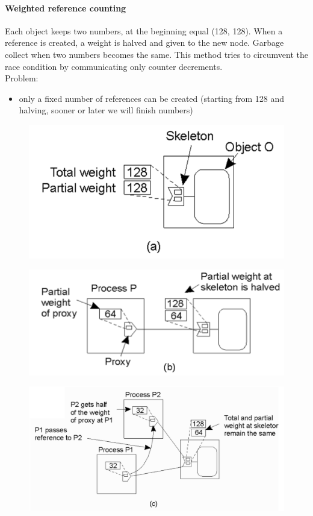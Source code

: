 \documentclass[10pt,a4paper]{article}
\begin{document}
\paragraph{Weighted reference counting}
Each object keeps two numbers, at the beginning equal (128, 128). When a reference is created, a weight is halved and given to the new node. Garbage collect when two numbers becomes the same. This method tries to circumvent the race condition by communicating only counter decrements. \\
Problem: 
\begin{itemize}
	\item only a fixed number of references can be created (starting from 128 and halving, sooner or later we will finish numbers)
\end{itemize}
\begin{figure}[h!]
\centering
\begin{minipage}{.3\textwidth}
  \includegraphics[width=.9\linewidth]{images/ref-a.png}
  \label{fig:ref-a}
\end{minipage}%
\begin{minipage}{.3\textwidth}
  \includegraphics[width=.9\linewidth]{images/ref-b.png}
  \label{fig:ref-b}
\end{minipage}%
\begin{minipage}{.3\textwidth}
  \includegraphics[width=.9\linewidth]{images/ref-c.png}
  \label{fig:ref-c}
\end{minipage}
\end{figure} 
\end{document}
